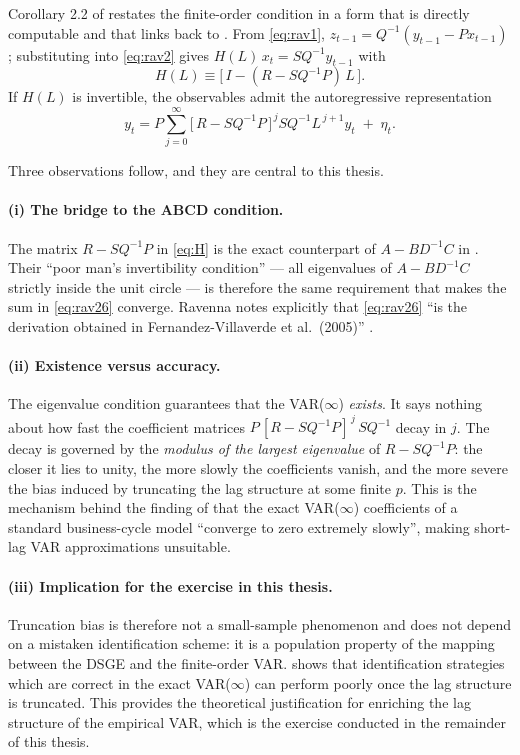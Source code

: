 Corollary 2.2 of \citet{Ravenna2007} restates the finite-order condition
in a form that is directly computable and that links back to
\citet{FVRRS2005}. From \eqref{eq:rav1}, $z_{t-1} = Q^{-1}(y_{t-1} - P
x_{t-1})$; substituting into \eqref{eq:rav2} gives $H(L)\,x_t = S Q^{-1}
y_{t-1}$ with
\begin{equation}
    H(L) \equiv \big[\,I - (R - S Q^{-1} P)\,L\,\big].
    \label{eq:H}
\end{equation}
If $H(L)$ is invertible, the observables admit the autoregressive
representation
\begin{equation}
    y_t
    = P \sum_{j=0}^{\infty} \big[\,R - S Q^{-1} P\,\big]^{\,j}
      S Q^{-1} L^{\,j+1} y_t \;+\; \eta_t .
    \label{eq:rav26}
\end{equation}

Three observations follow, and they are central to this thesis.

\paragraph{(i) The bridge to the ABCD condition.} The matrix
$R - S Q^{-1} P$ in \eqref{eq:H} is the exact counterpart of
$A - B D^{-1} C$ in \citet{FVRRS2005}. Their ``poor man's invertibility
condition'' --- all eigenvalues of $A - BD^{-1}C$ strictly inside the
unit circle --- is therefore the same requirement that makes the sum in
\eqref{eq:rav26} converge. Ravenna notes explicitly that
\eqref{eq:rav26} ``is the derivation obtained in Fernandez-Villaverde et
al.\ (2005)'' \citep{FVRRS2005}.

\paragraph{(ii) Existence versus accuracy.} The eigenvalue condition
guarantees that the VAR($\infty$) \emph{exists}. It says nothing about
how fast the coefficient matrices
$P\,[R - SQ^{-1}P]^{\,j}\,SQ^{-1}$ decay in $j$. The decay is governed by
the \emph{modulus of the largest eigenvalue} of $R - SQ^{-1}P$: the
closer it lies to unity, the more slowly the coefficients vanish, and the
more severe the bias induced by truncating the lag structure at some
finite $p$. This is the mechanism behind the finding of
\citet{ChariKehoeMcGrattan2005} that the exact VAR($\infty$) coefficients
of a standard business-cycle model ``converge to zero extremely slowly'',
making short-lag VAR approximations unsuitable.

\paragraph{(iii) Implication for the exercise in this thesis.} Truncation
bias is therefore not a small-sample phenomenon and does not depend on a
mistaken identification scheme: it is a population property of the mapping
between the DSGE and the finite-order VAR. \citet{Ravenna2007} shows that
identification strategies which are correct in the exact VAR($\infty$)
can perform poorly once the lag structure is truncated. This provides the
theoretical justification for enriching the lag structure of the
empirical VAR, which is the exercise conducted in the remainder of this
thesis.

